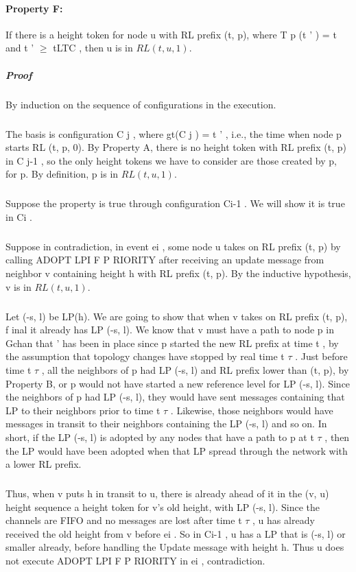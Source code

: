 \paragraph{Property F:} If there is a height token for node u with RL prefix (t, p), where T p (t ' ) = t and t ' $\geq$ tLTC , then u is in $RL (t, u, 1)$.
\subparagraph{Proof} By induction on the sequence of configurations in the execution.
\subparagraph{}The basis is configuration C j , where gt(C j ) = t ' , i.e., the time when node p starts RL (t, p, 0). By Property A, there is no height token with RL prefix (t, p) in C j-1 , so the only height tokens we have to consider are those created by p, for p. By definition, p is in $RL (t, u, 1)$.
\subparagraph{}Suppose the property is true through configuration Ci-1 . We will show it is true in Ci .
\subparagraph{}Suppose in contradiction, in event ei , some node u takes on RL prefix (t, p) by calling ADOPT LPI F P RIORITY after receiving an update message from neighbor v containing height h with RL prefix (t, p). By the inductive hypothesis, v is in $RL (t, u, 1)$.
\subparagraph{}Let (-s, l) be LP(h). We are going to show that when v takes on RL prefix (t, p), f inal it already has LP (-s, l). We know that v must have a path to node p in Gchan that ' has been in place since p started the new RL prefix at time t , by the assumption that topology changes have stopped by real time t $\tau$ . Just before time t $\tau$ , all the neighbors of p had LP (-s, l) and RL prefix lower than (t, p), by Property B, or p would not have started a new reference level for LP (-s, l). Since the neighbors of p had LP (-s, l), they would have sent messages containing that LP to their neighbors prior to time t $\tau$ . Likewise, those neighbors would have messages in transit to their neighbors containing the LP (-s, l) and so on. In short, if the LP (-s, l) is adopted by any nodes that have a path to p at t $\tau$ , then the LP would have been adopted when that LP spread through the network with a lower RL prefix. 
\subparagraph{}Thus, when v puts h in transit to u, there is already ahead of it in the (v, u) height sequence a height token for v's old height, with LP (-s, l). Since the channels are FIFO and no messages are lost after time t $\tau$ , u has already received the old height from v before ei . So in Ci-1 , u has a LP that is (-s, l) or smaller already, before handling the Update message with height h. Thus u does not execute ADOPT LPI F P RIORITY in ei , contradiction.
